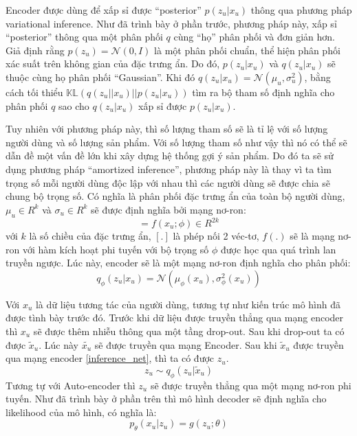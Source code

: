     Encoder được dùng để xấp sỉ được ``posterior'' $p(z_u|x_u)$ thông qua phương pháp variational inference. 
    Như đã trình bày ở phần trước, phương pháp này, xấp sỉ ``posterior'' thông qua một phân phối $q$ cùng ``họ'' phân phối và đơn giản hơn.
    Giả định rằng $p(z_u) = \mathcal{N}(0,I)$ là một phân phối chuẩn, thể hiện phân phối xác suất trên không gian của đặc trưng ẩn.
    Do đó, $p(z_u|x_u)$ và $q(z_u|x_u)$ sẽ thuộc cùng họ phân phối ``Gaussian''. 
    Khi đó $q(z_u|x_u) = \mathcal{N}(\mu_u,\sigma_u^2)$, bằng cách tối thiểu $\mathbb{KL}(q(z_u||x_u) || p(z_u|x_u))$ tìm ra bộ tham số định nghĩa cho phân phối $q$ sao cho $q(z_u | x_u)$ xấp sỉ được $p(z_u|x_u)$.    

    Tuy nhiên với phương pháp này, thì số lượng tham số sẽ là tỉ lệ với số lượng người dùng và số lượng sản phẩm.
    Với số lượng tham số như vậy thì nó có thể sẽ dẫn đề một vấn đề lớn khi xây dựng hệ thống gợi ý sản phẩm.
    Do đó ta sẽ sử dụng phương pháp ``amortized inference'', phương pháp này là thay vì ta tìm trọng số mỗi người dùng độc lập với nhau thì các người dùng sẽ được chia sẽ chung bộ trọng số.
    Có nghĩa là phân phối đặc trưng ẩn của toàn bộ người dùng, $\mu_u \in R^k $ và $\sigma_u \in R^k $ sẽ được định nghĩa bởi mạng nơ-ron:
    \begin{equation}
        [\mu_u,\sigma_u] = f(x_u;\phi) \in R^{2k}
    \end{equation}
    với $k$ là số chiều của đặc trưng ẩn, $[.]$ là phép nối 2 véc-tơ, $f(.)$ sẽ là mạng nơ-ron với hàm kích hoạt phi tuyến với bộ trọng số $\phi$ được học qua quá trình lan truyền ngược.
    Lúc này, encoder sẽ là một mạng nơ-ron định nghĩa cho phân phối:
    \begin{equation}
        \label{inference_net}
        q_\phi(z_u|x_u) = \mathcal{N}(\mu_\phi(x_u),\sigma^2_\phi(x_u))
    \end{equation}
    

    Với $x_u$ là dữ liệu tương tác của người dùng, tương tự như kiến trúc mô hình đã được tình bày trước đó.
    Trước khi dữ liệu được truyền thẳng qua mạng encoder thì $x_u$ sẽ được thêm nhiễu thông qua một tầng drop-out. 
    Sau khi drop-out ta có được $\tilde{x}_u$. 
    Lúc này $\tilde{x_u}$ sẽ được truyền qua mạng Encoder. 
    Sau khi $\tilde{x}_u$ được truyền qua mạng encoder \ref{inference_net}, thì ta có được $z_u$.
    \begin{equation}
        \label{sampling_zu}
        z_u \sim q_\phi(z_u|\tilde{x}_u)
    \end{equation}
    Tương tự với Auto-encoder thì $z_u$ sẽ được truyền thẳng qua một mạng nơ-ron phi tuyến. 
    Như đã trình bày ở phần trên thì mô hình decoder sẽ định nghĩa cho likelihood của mô hình, có nghĩa là:
    \begin{equation}
        \label{generative_net}
        p_\theta(x_u|z_u) = g(z_u;\theta)
    \end{equation}

